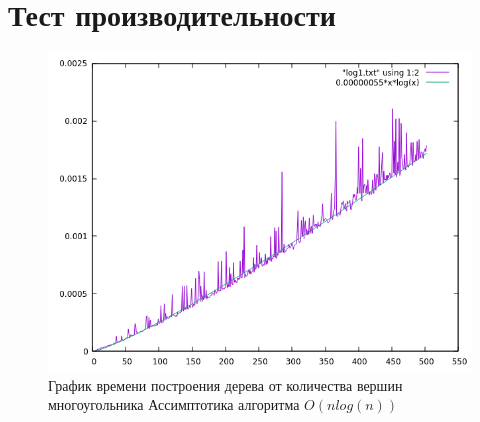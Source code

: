 
\section{Тест производительности}

\begin{figure}[h]
  \begin{center}
    \includegraphics[scale=0.6]{../plots/index.png}
  \end{center}
  \caption{
    График времени построения дерева от количества вершин многоугольника
    Ассимптотика алгоритма $O(nlog(n))$
  }
\end{figure}

